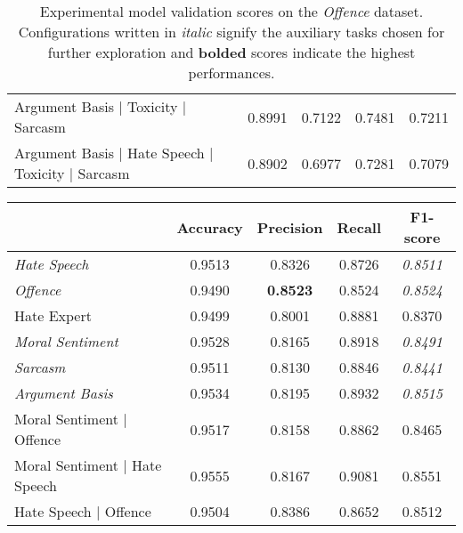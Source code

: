 \begin{table}[]
\begin{tabular}{l|cccc}
    Argument Basis | Toxicity | Sarcasm               & 0.8991          & 0.7122    & 0.7481          & 0.7211          \\
    Argument Basis | Hate Speech | Toxicity | Sarcasm & 0.8902          & 0.6977    & 0.7281          & 0.7079
  \end{tabular}
  \caption{Experimental model validation scores on the \textit{Offence} dataset. Configurations written in \textit{italic} signify the auxiliary tasks chosen for further exploration and \textbf{bolded} scores indicate the highest performances.}
  \label{tab:mtl_dev_davidson}
\end{table}

\begin{table}[]
  \begin{tabular}{l|cccc}
                                                                       & Accuracy        & Precision       & Recall          & F1-score        \\\hline
    \textit{Hate Speech}                                               & 0.9513          & 0.8326          & 0.8726          & \textit{0.8511} \\
    \textit{Offence}                                                   & 0.9490          & \textbf{0.8523} & 0.8524          & \textit{0.8524} \\
    Hate Expert                                                        & 0.9499          & 0.8001          & 0.8881          & 0.8370          \\
    \textit{Moral Sentiment}                                           & 0.9528          & 0.8165          & 0.8918          & \textit{0.8491} \\
    \textit{Sarcasm}                                                   & 0.9511          & 0.8130          & 0.8846          & \textit{0.8441} \\
    \textit{Argument Basis}                                            & 0.9534          & 0.8195          & 0.8932          & \textit{0.8515} \\
    Moral Sentiment | Offence                                          & 0.9517          & 0.8158          & 0.8862          & 0.8465          \\
    Moral Sentiment | Hate Speech                                      & 0.9555          & 0.8167          & 0.9081          & 0.8551          \\
    Hate Speech | Offence                                              & 0.9504          & 0.8386          & 0.8652          & 0.8512          \\

\end{tabular}
\end{table}
